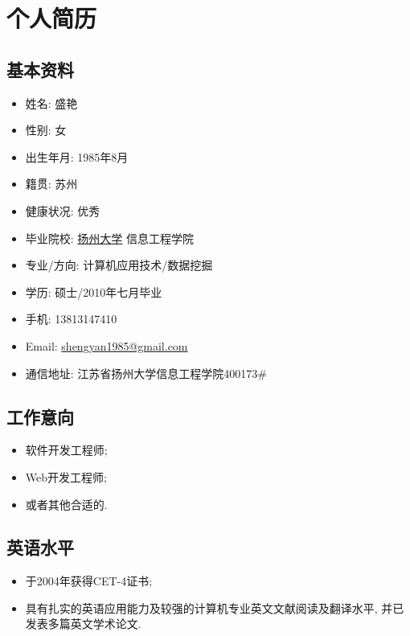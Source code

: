 \documentclass[a4paper,10pt,english]{manual}
\begin{document}

\chapter{个人简历}
\section{基本资料}
\begin{itemize}
\item {} 
姓名: 盛艳

\item {} 
性别: 女

\item {} 
出生年月: 1985年8月

\item {} 
籍贯: 苏州

\item {} 
健康状况: 优秀

\item {} 
毕业院校: \href{http://www.yzu.edu.cn}{扬州大学} 信息工程学院

\item {} 
专业/方向: 计算机应用技术/数据挖掘

\item {} 
学历: 硕士/2010年七月毕业

\item {} 
手机: 13813147410

\item {} 
Email: \href{mailto:shengyan1985@gmail.com}{shengyan1985@gmail.com}

\item {} 
通信地址: 江苏省扬州大学信息工程学院400173\#

\end{itemize}

\section{工作意向}
\begin{itemize}
\item {} 
软件开发工程师;

\item {} 
Web开发工程师;

\item {} 
或者其他合适的.

\end{itemize}


\section{英语水平}
\begin{itemize}
\item {} 
于2004年获得CET-4证书;

\item {} 
具有扎实的英语应用能力及较强的计算机专业英文文献阅读及翻译水平, 并已发表多篇英文学术论文.

\end{itemize}
\end{document}
